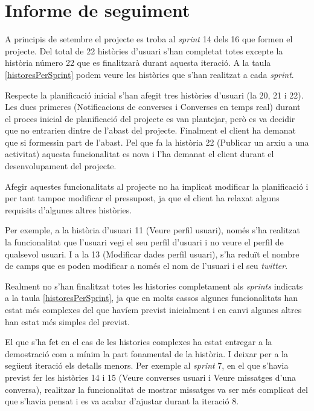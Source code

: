 \section{Informe de seguiment}


A principis de setembre el projecte es troba al \textit{sprint} 14 dels 16 que formen el projecte. Del total de 22 històries d'usuari s'han completat totes excepte la història número 22 que es finalitzarà durant aquesta iteració. A la taula \ref{historesPerSprint} podem veure les històries que s'han realitzat a cada \textit{sprint}.



Respecte la planificació inicial s'han afegit tres històries d'usuari (la 20, 21 i 22). Les dues primeres (Notificacions de converses i Converses en temps real) durant el proces inicial de planificació del projecte es van plantejar, però es va decidir que no entrarien dintre de l'abast del projecte. Finalment el client ha demanat que si formessin part de l'abast. Pel que fa la història 22 (Publicar un arxiu a una activitat) aquesta funcionalitat es nova i l'ha demanat el client durant el desenvolupament del projecte.

Afegir aquestes funcionalitats al projecte no ha implicat modificar la planificació i per tant tampoc modificar el pressupost, ja que el client ha relaxat alguns requisits d'algunes altres històries. 

Per exemple, a la història d'usuari 11 (Veure perfil usuari), només s'ha realitzat la funcionalitat que l'usuari vegi el seu perfil d'usuari i no veure el perfil de qualsevol usuari. I a la 13 (Modificar dades perfil usuari), s'ha reduït el nombre de camps que es poden modificar a només el nom de l'usuari i el seu \textit{twitter}.

Realment no s'han finalitzat totes les histories completament als \textit{sprints} indicats a la taula \ref{historesPerSprint}, ja que en molts cassos algunes funcionalitats han estat més complexes del que havíem previst inicialment i en canvi algunes altres han estat més simples del previst. 

El que s'ha fet en el cas de les histories complexes ha estat entregar a la demostració com a mínim la part fonamental de la història. I deixar per a la següent iteració els detalls menors. Per exemple al \textit{sprint} 7, en el que s'havia previst fer les històries 14 i 15 (Veure converses usuari i Veure missatges d’una conversa), realitzar la funcionalitat de mostrar missatges va ser més complicat del que s'havia pensat i es va acabar d'ajustar durant la iteració 8.

